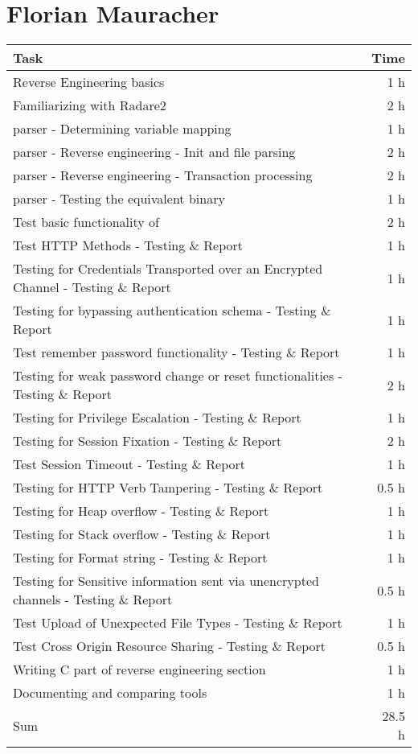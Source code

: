 \clearpage
\section*{Florian Mauracher}
\begin{table}[h!tpb]
  \centering
  \begin{tabularx}{\textwidth}{X r}
    \toprule
      Task & Time \\
    \midrule
      Reverse Engineering basics & 1 h \\
      Familiarizing with Radare2 & 2 h \\
      parser - Determining variable mapping & 1 h \\
      parser - Reverse engineering - Init and file parsing & 2 h \\
      parser - Reverse engineering - Transaction processing & 2 h \\
      parser - Testing the equivalent binary & 1 h \\
      Test basic functionality of \bs{} & 2 h \\
      Test HTTP Methods - Testing \& Report & 1 h \\
      Testing for Credentials Transported over an Encrypted Channel - Testing \& Report & 1 h \\
      Testing for bypassing authentication schema - Testing \& Report & 1 h \\
      Test remember password functionality - Testing \& Report & 1 h \\
      Testing for weak password change or reset functionalities - Testing \& Report & 2 h \\
      Testing for Privilege Escalation - Testing \& Report & 1 h \\
      Testing for Session Fixation - Testing \& Report & 2 h \\
      Test Session Timeout - Testing \& Report & 1 h \\
      Testing for HTTP Verb Tampering - Testing \& Report & 0.5 h \\
      Testing for Heap overflow - Testing \& Report & 1 h \\
      Testing for Stack overflow - Testing \& Report & 1 h \\
      Testing for Format string - Testing \& Report & 1 h \\
      Testing for Sensitive information sent via unencrypted channels - Testing \& Report & 0.5 h \\
      Test Upload of Unexpected File Types - Testing \& Report & 1 h \\
      Test Cross Origin Resource Sharing - Testing \& Report & 0.5 h \\
      Writing C part of reverse engineering section & 1 h \\
      Documenting and comparing tools & 1 h \\
    \midrule
      Sum & 28.5 h \\
    \bottomrule
  \end{tabularx}
\end{table}

